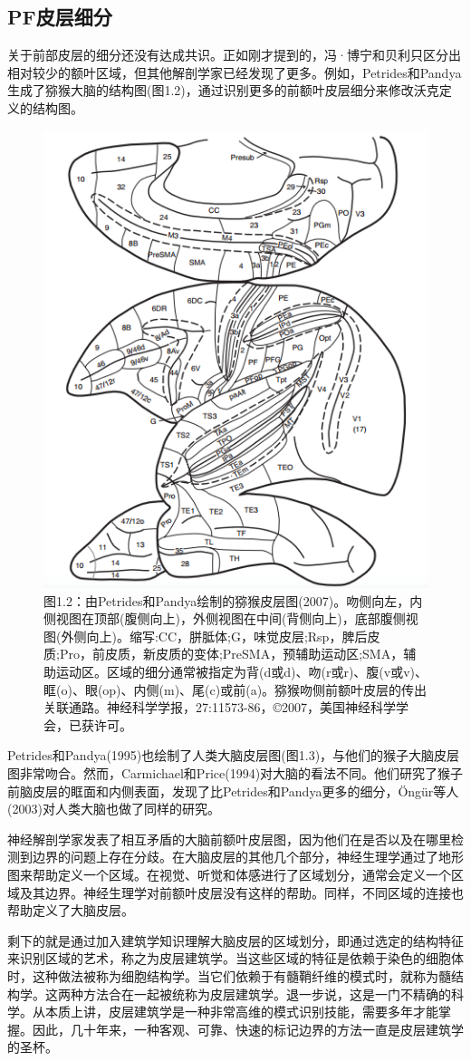 \subsection{PF皮层细分}
关于前部皮层的细分还没有达成共识。正如刚才提到的，冯·博宁和贝利只区分出相对较少的额叶区域，但其他解剖学家已经发现了更多。例如，Petrides和Pandya生成了猕猴大脑的结构图(图1.2)，通过识别更多的前额叶皮层细分来修改沃克定义的结构图。


\begin{figure}[!htb]
	\centering
	\includegraphics[width=0.5\linewidth]{image_pfc/Fig_1_2}
	\caption*{图1.2：由Petrides和Pandya绘制的猕猴皮层图(2007)。吻侧向左，内侧视图在顶部(腹侧向上)，外侧视图在中间(背侧向上)，底部腹侧视图(外侧向上)。缩写:CC，胼胝体;G，味觉皮层;Rsp，脾后皮质;Pro，前皮质，新皮质的变体;PreSMA，预辅助运动区;SMA，辅助运动区。区域的细分通常被指定为背(d或d)、吻(r或r)、腹(v或v)、眶(o)、眼(op)、内侧(m)、尾(c)或前(a)。猕猴吻侧前额叶皮层的传出关联通路。神经科学学报，27:11573-86，©2007，美国神经科学学会，已获许可。}
\end{figure}


\par
Petrides和Pandya(1995)也绘制了人类大脑皮层图(图1.3)，与他们的猴子大脑皮层图非常吻合。然而，Carmichael和Price(1994)对大脑的看法不同。他们研究了猴子前脑皮层的眶面和内侧表面，发现了比Petrides和Pandya更多的细分，Öngür等人(2003)对人类大脑也做了同样的研究。

\par
神经解剖学家发表了相互矛盾的大脑前额叶皮层图，因为他们在是否以及在哪里检测到边界的问题上存在分歧。在大脑皮层的其他几个部分，神经生理学通过了地形图来帮助定义一个区域。在视觉、听觉和体感进行了区域划分，通常会定义一个区域及其边界。神经生理学对前额叶皮层没有这样的帮助。同样，不同区域的连接也帮助定义了大脑皮层。
\par
剩下的就是通过加入建筑学知识理解大脑皮层的区域划分，即通过选定的结构特征来识别区域的艺术，称之为皮层建筑学。当这些区域的特征是依赖于染色的细胞体时，这种做法被称为细胞结构学。当它们依赖于有髓鞘纤维的模式时，就称为髓结构学。这两种方法合在一起被统称为皮层建筑学。退一步说，这是一门不精确的科学。从本质上讲，皮层建筑学是一种非常高维的模式识别技能，需要多年才能掌握。因此，几十年来，一种客观、可靠、快速的标记边界的方法一直是皮层建筑学的圣杯。

